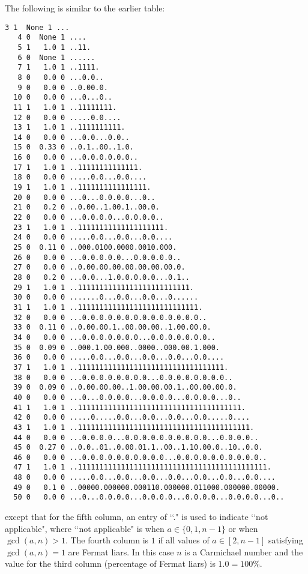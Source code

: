 The following is similar to the earlier table:
\begin{Verbatim}[frame=single,fontsize=\footnotesize]
   3 1  None 1 ...
   4 0  None 1 ....
   5 1   1.0 1 ..11.
   6 0  None 1 ......
   7 1   1.0 1 ..1111.
   8 0   0.0 0 ...0.0..
   9 0   0.0 0 ..0.00.0.
  10 0   0.0 0 ...0...0..
  11 1   1.0 1 ..11111111.
  12 0   0.0 0 .....0.0....
  13 1   1.0 1 ..1111111111.
  14 0   0.0 0 ...0.0...0.0..
  15 0  0.33 0 ..0.1..00..1.0.
  16 0   0.0 0 ...0.0.0.0.0.0..
  17 1   1.0 1 ..11111111111111.
  18 0   0.0 0 .....0.0...0.0....
  19 1   1.0 1 ..1111111111111111.
  20 0   0.0 0 ...0...0.0.0.0...0..
  21 0   0.2 0 ..0.00..1.00.1..00.0.
  22 0   0.0 0 ...0.0.0.0...0.0.0.0..
  23 1   1.0 1 ..11111111111111111111.
  24 0   0.0 0 .....0.0...0.0...0.0....
  25 0  0.11 0 ..000.0100.0000.0010.000.
  26 0   0.0 0 ...0.0.0.0.0...0.0.0.0.0..
  27 0   0.0 0 ..0.00.00.00.00.00.00.00.0.
  28 0   0.2 0 ...0.0...1.0.0.0.0.0...0.1..
  29 1   1.0 1 ..11111111111111111111111111.
  30 0   0.0 0 .......0...0.0...0.0...0......
  31 1   1.0 1 ..1111111111111111111111111111.
  32 0   0.0 0 ...0.0.0.0.0.0.0.0.0.0.0.0.0.0..
  33 0  0.11 0 ..0.00.00.1..00.00.00..1.00.00.0.
  34 0   0.0 0 ...0.0.0.0.0.0.0...0.0.0.0.0.0.0..
  35 0  0.09 0 ..000.1.00.000..0000..000.00.1.000.
  36 0   0.0 0 .....0.0...0.0...0.0...0.0...0.0....
  37 1   1.0 1 ..1111111111111111111111111111111111.
  38 0   0.0 0 ...0.0.0.0.0.0.0.0...0.0.0.0.0.0.0.0..
  39 0  0.09 0 ..0.00.00.00..1.00.00.00.1..00.00.00.0.
  40 0   0.0 0 ...0...0.0.0.0...0.0.0.0...0.0.0.0...0..
  41 1   1.0 1 ..11111111111111111111111111111111111111.
  42 0   0.0 0 .....0.....0.0...0.0...0.0...0.0.....0....
  43 1   1.0 1 ..1111111111111111111111111111111111111111.
  44 0   0.0 0 ...0.0.0.0...0.0.0.0.0.0.0.0.0.0...0.0.0.0..
  45 0  0.27 0 ..0.0..01..0.00.01.1..00..1.10.00.0..10..0.0.
  46 0   0.0 0 ...0.0.0.0.0.0.0.0.0.0...0.0.0.0.0.0.0.0.0.0..
  47 1   1.0 1 ..11111111111111111111111111111111111111111111.
  48 0   0.0 0 .....0.0...0.0...0.0...0.0...0.0...0.0...0.0....
  49 0   0.1 0 ..00000.000000.000110.000000.011000.000000.00000.
  50 0   0.0 0 ...0...0.0.0.0...0.0.0.0...0.0.0.0...0.0.0.0...0..
\end{Verbatim}
except that for the fifth column,
an entry of \lq\lq ." is used to indicate \lq\lq not applicable",
where \lq\lq not applicable" is when
$a \in \{0, 1, n-1\}$ or when $\gcd(a, n) > 1$.
The fourth column is $1$ if all values of $a \in [2, n - 1]$
satisfying $\gcd(a, n) = 1$ are Fermat liars.
In this case $n$ is a Carmichael number
and the value for the third column (percentage of Fermat liars)
is $1.0 = 100\%$.

